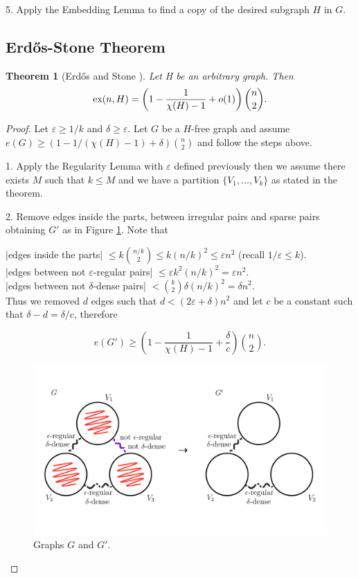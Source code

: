 \documentclass[12pt,twoside,a4paper,bibliography=totocnumbered]{book}
\numberwithin{equation}{section}
\newtheorem{theorem}             {Theorem}[section]
\theoremstyle{remark}
\def\ex{\mathop{\text{\rm ex}}\nolimits}
\begin{document}
5. Apply the Embedding Lemma to find a copy of the desired subgraph $H$ in $G$.
\subsection{Erd\H{o}s-Stone Theorem}

\begin{theorem}[{Erd\H{o}s and Stone \cite{ErSt46}}] Let H be an arbitrary graph. Then
$$ \ex(n,H) = \left(1-\frac{1}{\chi (H)-1} + o(1)\right) \binom{n}{2}.$$ 
\end{theorem}

\begin{proof}
Let $\varepsilon \geq 1/k$ and $\delta \geq \varepsilon$. Let $G$ be a $H$-free graph and assume $e(G) \geq (1 - 1/(\chi(H) - 1) + \delta)\binom{n}{2}$ and follow the steps above.

1. Apply the Regularity Lemma  with $\varepsilon$ defined previously then we assume there exists $M$ such that $k \leq M$ and we have a partition $\{V_1, \ldots , V_k\}$ as stated in the theorem.

2. Remove edges inside the parts, between irregular pairs and sparse pairs obtaining $G'$ as in Figure \ref{fig:graph-G-and-G'}.
Note that

|edges inside the parts| $\leq k\binom{n/k}{2} \leq k(n/k)^2 \leq \varepsilon n^2$ (recall $1/\varepsilon \leq k$).\\

|edges between not $\varepsilon$-regular pairs| $\leq \varepsilon k^2 (n/k)^2 = \varepsilon n^2$.\\

|edges between not $\delta$-dense pairs| $< \binom{k}{2}\delta (n/k)^2 = \delta n^2$.\\ 

Thus we removed $d$ edges such that $d < (2\varepsilon + \delta)n^2$ and let $c$ be a constant such that $\delta -d= \delta /c$, therefore 

$$ e(G') \geq  \left( 1 - \frac{1}{\chi(H) - 1} + \frac{\delta}{c}\right) \binom{n}{2}.$$

\begin{figure}[H]
     \centering
     \includegraphics[scale=1.5]{Figuras/graph-G-and-G'.jpg}
     \caption{Graphs $G$ and $G'$.}
     \label{fig:graph-G-and-G'}
\end{figure}


\end{proof}
\end{document}
